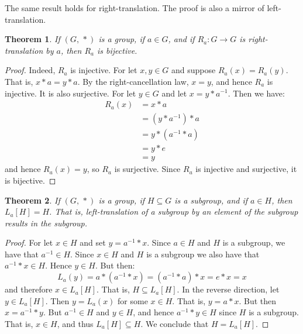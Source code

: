 \documentclass{article}
\theoremstyle{plain}
\newtheorem{theorem}{Theorem}[section]
\theoremstyle{normal}
\begin{document}
        The same result holds for right-translation. The proof is also a mirror
        of left-translation.
        \begin{theorem}
            If $(G,\,*)$ is a group, if $a\in{G}$, and if
            $R_{a}:G\rightarrow{G}$ is right-translation by $a$, then
            $R_{a}$ is bijective.
        \end{theorem}
        \begin{proof}
            Indeed, $R_{a}$ is injective. For let $x,y\in{G}$ and suppose
            $R_{a}(x)=R_{a}(y)$. That is, $x*a=y*a$. By the right-cancellation
            law, $x=y$, and hence $R_{a}$ is injective. It is also surjective.
            For let $y\in{G}$ and let $x=y*a^{-1}$. Then we have:
            \begin{align}
                R_{a}(x)&=x*a\tag{Definition}\\
                &=(y*a^{-1})*a\tag{Substitution}\\
                &=y*(a^{-1}*a)\tag{Associativity}\\
                &=y*e\tag{Inverse}\\
                &=y\tag{Identity}
            \end{align}
            and hence $R_{a}(x)=y$, so $R_{a}$ is surjective. Since $R_{a}$ is
            injective and surjective, it is bijective.
        \end{proof}
        \begin{theorem}
            If $(G,\,*)$ is a group, if $H\subseteq{G}$ is a subgroup, and if
            $a\in{H}$, then $L_{a}[H]=H$. That is, left-translation of a
            subgroup by an element of the subgroup results in the subgroup.
        \end{theorem}
        \begin{proof}
            For let $x\in{H}$ and set $y=a^{-1}*x$. Since $a\in{H}$ and $H$ is
            a subgroup, we have that $a^{-1}\in{H}$. Since $x\in{H}$ and $H$
            is a subgroup we also have that $a^{-1}*x\in{H}$. Hence $y\in{H}$.
            But then:
            \begin{equation}
                L_{a}(y)=a*(a^{-1}*x)=(a^{-1}*a)*x=e*x=x
            \end{equation}
            and therefore $x\in{L}_{a}[H]$. That is, $H\subseteq{L}_{a}[H]$. In
            the reverse direction, let $y\in{L}_{a}[H]$. Then
            $y=L_{a}(x)$ for some $x\in{H}$. That is, $y=a*x$. But then
            $x=a^{-1}*y$. But $a^{-1}\in{H}$ and $y\in{H}$, and hence
            $a^{-1}*y\in{H}$ since $H$ is a subgroup. That is,
            $x\in{H}$, and thus $L_{a}[H]\subseteq{H}$. We conclude that
            $H=L_{a}[H]$.
        \end{proof}
\end{document}
